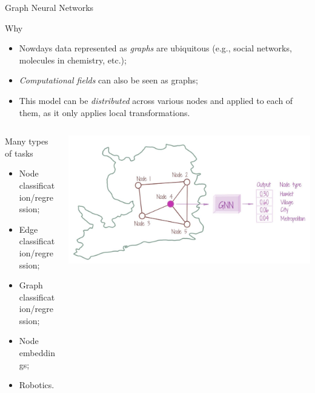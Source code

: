 \documentclass[presentation]{beamer}\mode<presentation>{\usetheme{AMSBolognaFC}}
\begin{document}
\begin{frame}[c]{Graph Neural Networks}

\begin{block}{Why}
	\begin{itemize}
		\item Nowdays data represented as \emph{graphs} are ubiquitous 
			(e.g., social networks, molecules in chemistry, etc.);
		\item \emph{Computational fields} can also be seen as graphs;
		\item This model can be \emph{distributed} across various nodes and applied to each of them, 
			as it only applies local transformations.
	\end{itemize}
\end{block}

\begin{columns}
	\begin{column}{0.5\textwidth}
		\begin{alertblock}{Many types of tasks}
			\begin{itemize}
				\item Node classification/regression;
				\item Edge classification/regression;
				\item Graph classification/regression;
				\item Node embeddings;
				\item Robotics.
			\end{itemize}
		\end{alertblock}
	\end{column}
	\begin{column}{0.5\textwidth}
		\includegraphics[width=\textwidth]{img/gnn.png}
	\end{column}
\end{columns}


\end{frame}
\end{document}

